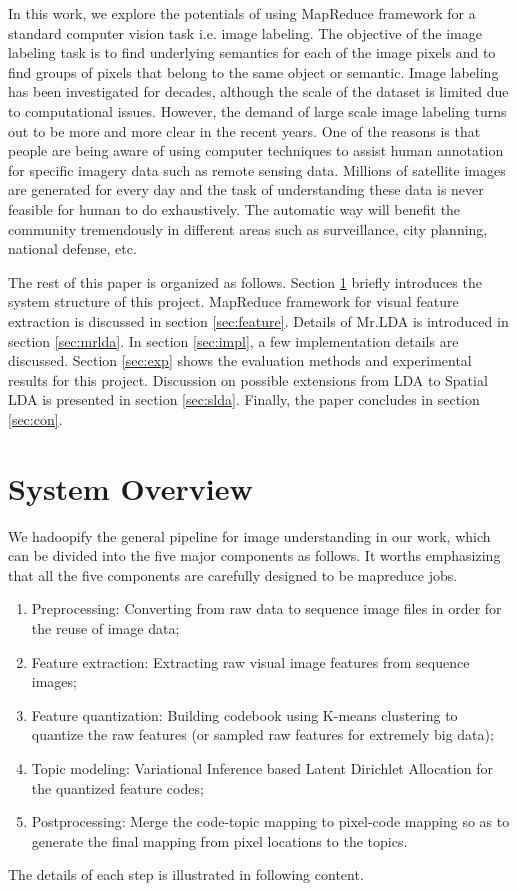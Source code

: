 \documentclass{acm_proc_article-sp}
\begin{document}
In this work, we explore the potentials of using MapReduce framework for a standard computer vision task i.e. image labeling. The objective of the image labeling task is to find underlying semantics for each of the image pixels and to find groups of pixels that belong to the same object or semantic. Image labeling has been investigated for decades, although the scale of the dataset is limited due to computational issues. However, the demand of large scale image labeling turns out to be more and more clear in the recent years. One of the reasons is that people are being aware of using computer techniques to assist human annotation for specific imagery data such as remote sensing data. Millions of satellite images are generated for every day and the task of understanding these data is never feasible for human to do exhaustively. The automatic way will benefit the community tremendously in different areas such as surveillance, city planning, national defense, etc.

The rest of this paper is organized as follows.
Section \ref{sec:overview} briefly introduces the system structure of this project.
MapReduce framework for visual feature extraction is discussed in section \ref{sec:feature}.
Details of Mr.LDA is introduced in section \ref{sec:mrlda}. In section \ref{sec:impl}, a few implementation details are
discussed. Section \ref{sec:exp} shows the evaluation methods and experimental results for this project. Discussion on
possible extensions from LDA to Spatial LDA is presented in section \ref{sec:slda}. Finally, the paper concludes in section \ref{sec:con}.


\section{System Overview}\label{sec:overview}
We hadoopify the general pipeline for image understanding in our work, which can be divided into the five major components as follows. It worths emphasizing that all the five components are carefully designed to be mapreduce jobs.
\begin{enumerate}
 \item Preprocessing: Converting from raw data to sequence image files in order for the reuse of image data;
 \item Feature extraction: Extracting raw visual image features from sequence images;
 \item Feature quantization: Building codebook using K-means clustering to quantize the raw features (or sampled raw features for extremely big data);
 \item Topic modeling: Variational Inference based Latent Dirichlet Allocation for the quantized feature codes;
 \item Postprocessing: Merge the code-topic mapping to pixel-code mapping so as to generate the final mapping from pixel locations to the topics.
\end{enumerate}
The details of each step is illustrated in following content.
\end{document}
